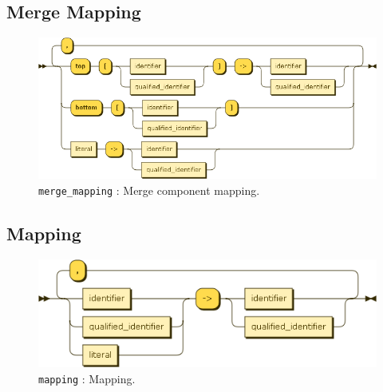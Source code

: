 \subsection{Merge Mapping}
\begin{figure}[!h]
  \centering
    \includegraphics[scale=\DiagramScale,angle=90]{chapters/compiler/diagrams/merge_mapping}
  \caption{\texttt{merge\_mapping} : Merge component mapping.}
  \label{fig:pcl-merge-mapping}
\end{figure}

\subsection{Mapping}
\begin{figure}[!h]
  \centering
    \includegraphics[scale=\DiagramScale]{chapters/compiler/diagrams/mapping}
  \caption{\texttt{mapping} : Mapping.}
  \label{fig:pcl-signal-mapping}
\end{figure}

